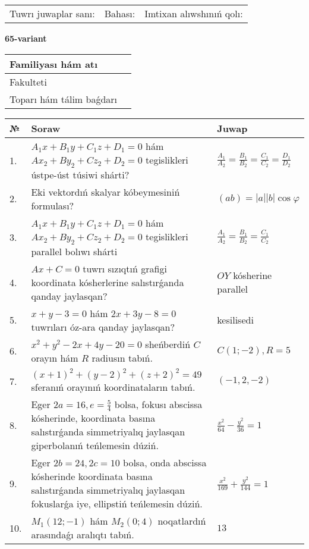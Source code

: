 \documentclass{article}
\begin{document}
\vspace{1cm}

\begin{tabular}{lll}
Tuwrı juwaplar sanı: \underline{\hspace{1.5cm}} & 
Bahası: \underline{\hspace{1.5cm}} & 
Imtixan alıwshınıń qolı: \underline{\hspace{2cm}} \\
\end{tabular}

\egroup

\newpage


\textbf{65-variant}\\

\bgroup
\def\arraystretch{1.6} %

\begin{tabular}{|m{5.7cm}|m{9.5cm}|}
\hline
Familiyası hám atı & \\
\hline
Fakulteti  & \\
\hline
Toparı hám tálim baǵdarı  & \\
\hline
\end{tabular}

\vspace{1cm}

\begin{tabular}{|m{0.7cm}|m{10cm}|m{4cm}|}
\hline
№ & Soraw & Juwap \\
\hline
1. & $A_1x+B_1y+C_1z+D_1=0$ hám $Ax_2+By_2+Cz_2+D_2=0$ tegislikleri ústpe-úst túsiwi shárti? & $\frac{A_1}{A_2}=\frac{B_1}{B_2}=\frac{C_1}{C_2}=\frac{D_1}{D_2}$ \\
\hline
2. & Eki vektordıń skalyar kóbeymesiniń formulası? & $(ab)=|a||b|\cos\varphi$ \\
\hline
3. & $A_1x+B_1y+C_1z+D_1=0$ hám $Ax_2+By_2+Cz_2+D_2=0$ tegislikleri parallel bolıwı shárti & $\frac{A_1}{A_2}=\frac{B_1}{B_2}=\frac{C_1}{C_2}$ \\
\hline
4. & $Ax+C=0$ tuwrı sızıqtıń grafigi koordinata kósherlerine salıstırǵanda qanday jaylasqan? & $OY$ kósherine parallel \\
\hline
5. & $x+y-3=0$ hám $2x+3y-8=0$ tuwrıları óz-ara qanday jaylasqan? & kesilisedi \\
\hline
6. & $x^{2}+y^{2}-2x+4y-20=0$ sheńberdiń $C$ orayın hám $R$ radiusın tabıń. & $C(1;-2), R=5$ \\
\hline
7. & $(x+1)^{2}+(y-2) ^{2}+(z+2) ^{2}=49$ sferanıń orayınıń koordinataların tabıń. & $(-1,2,-2)$ \\
\hline
8. & Eger $2a=16, e=\frac{5}{4}$ bolsa, fokusı abscissa kósherinde, koordinata basına salıstırǵanda simmetriyalıq jaylasqan giperbolanıń teńlemesin dúziń. & $\frac{x^{2}}{64}-\frac{y^{2}}{36}=1$ \\
\hline
9. & Eger $2b=24, 2 c=10$ bolsa, onda abscissa kósherinde koordinata basına salıstırǵanda simmetriyalıq jaylasqan fokuslarǵa iye, ellipstiń teńlemesin dúziń. & $\frac{x^{2}}{169}+\frac{y^{2}}{144}=1$ \\
\hline
10. & $M_{1} (12;-1)$ hám $M_{2} (0;4)$ noqatlardıń arasındaǵı aralıqtı tabıń. & $13$ \\
\hline
\end{tabular}
\end{document}
